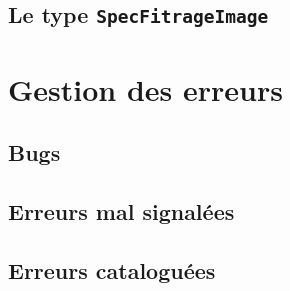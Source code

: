 \subsection{Le type {\tt SpecFitrageImage}}


\section{Gestion des erreurs}

\subsection{Bugs}


\subsection{Erreurs mal signal\'ees}

\subsection{Erreurs catalogu\'ees}
\label{Err:Catal}





